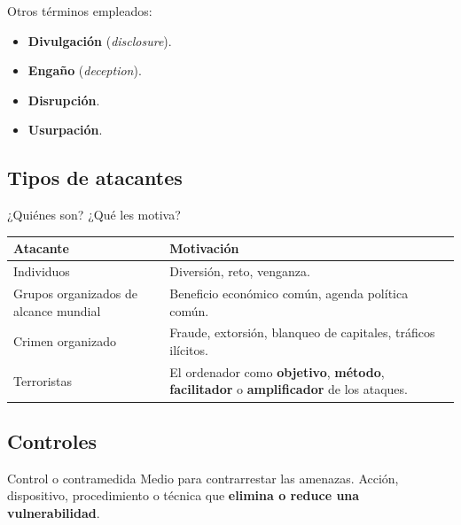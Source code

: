 \documentclass[11pt,a4paper]{report}
\begin{document}
Otros términos empleados:
\begin{itemize}
  \item \textbf{Divulgación} (\emph{disclosure}).
  \item \textbf{Engaño} (\emph{deception}).
  \item \textbf{Disrupción}.
  \item \textbf{Usurpación}.
\end{itemize}

\subsection{Tipos de atacantes}

¿Quiénes son? ¿Qué les motiva?

\begin{center}
\small
{\setlength{\aboverulesep}{0pt}\setlength{\belowrulesep}{0pt}\renewcommand{\arraystretch}{1.35}%
\begin{tabularx}{\linewidth}{>{\raggedright\arraybackslash}p{4.2cm} !{\color{gray!45}\vrule width 0.2pt} >{\raggedright\arraybackslash}X}
\toprule
\textbf{Atacante} & \textbf{Motivación} \\
\midrule
Individuos & Diversión, reto, venganza. \\ 
Grupos organizados de alcance mundial & Beneficio económico común, agenda política común. \\ 
Crimen organizado & Fraude, extorsión, blanqueo de capitales, tráficos ilícitos. \\ 
Terroristas & El ordenador como \textbf{objetivo}, \textbf{método}, \textbf{facilitador} o \textbf{amplificador} de los ataques. \\
\bottomrule
\end{tabularx}}
\end{center}

\subsection{Controles}

\begin{definicion}{Control o contramedida}
Medio para contrarrestar las amenazas. Acción, dispositivo, procedimiento o técnica que \textbf{elimina o reduce una vulnerabilidad}.
\end{definicion}
\end{document}
